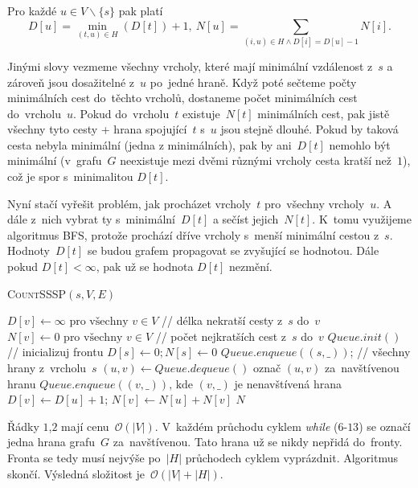 \documentclass[12pt]{article}
\newcommand{\la}{\leftarrow}
\renewcommand{\O}{\mathcal{O}}
\begin{document}

\noindent
Pro každé $u \in V \smallsetminus \{s\}$ pak platí
$$ D[u] = \min_{(t,u) \in H}(D[t])+1,~N[u] = \sum_{(i,u) \in H \wedge D[i] = D[u]-1} N[i].$$

\noindent
Jinými slovy vezmeme všechny vrcholy, které mají minimální vzdálenost z~$s$ a
zároveň jsou dosažitelné z~$u$ po~jedné hraně. Když poté sečteme počty
minimálních cest do~těchto vrcholů, dostaneme počet minimálních cest do~vrcholu~$u$. Pokud do~vrcholu~$t$ existuje~$N[t]$ minimálních cest, pak jistě všechny
tyto cesty + hrana spojující~$t$ s~$u$ jsou stejně dlouhé. Pokud by taková cesta
nebyla minimální (jedna z minimálních), pak by ani~$D[t]$ nemohlo být minimální
(v~grafu~$G$ neexistuje mezi dvěmi různými vrcholy cesta kratší než~$1$), což je
spor s~minimalitou $D[t]$.

\noindent
Nyní stačí vyřešit problém, jak procházet vrcholy~$t$ pro~všechny vrcholy~$u$. A dále z~nich vybrat ty s~minimální~$D[t]$ a sečíst jejich~$N[t]$. K~tomu
využijeme algoritmus \textsc{BFS}, protože prochází dříve vrcholy s~menší
minimální cestou z~$s$. Hodnoty~$D[t]$ se budou grafem propagovat se
zvyšující se hodnotou. Dále pokud $D[t] < \infty$, pak už se hodnota $D[t]$ nezmění.

\begin{algorithm}
\textsc{CountSSSP}$(s, V, E)$
\begin{algorithmic}[1]
\STATE $D[v] \la \infty \mbox{ pro všechny } v \in V$ // délka nekratší cesty z~$s$ do~$v$
\STATE $N[v] \la 0 \mbox{ pro všechny } v \in V$ // počet nejkratších cest z~$s$ do~$v$
\STATE $Queue.init()$ // inicializuj frontu
\STATE $D[s] \la 0; N[s] \la 0$
\STATE $Queue.enqueue((s,\_))$; // všechny hrany z~vrcholu~$s$
\STATE $(u,v) \la Queue.dequeue()$
\STATE označ $(u,v)$ za~navštívenou hranu
\STATE $Queue.enqueue((v,\_)) \mbox{, kde } (v,\_)$ je nenavštívená hrana
\STATE $D[v] \la D[u]+1$; $N[v] \la N[u] + N[v]$
\ENDIF
\ENDWHILE
\RETURN $N$
\end{algorithmic}
\end{algorithm}
Řádky $1$,$2$ mají cenu~$\O(|V|)$. V~každém průchodu cyklem
\textit{while} ($6$-$13$) se označí jedna hrana grafu~$G$ za~navštívenou. Tato
hrana už se nikdy nepřidá do~fronty. Fronta se tedy musí nejvýše po~$|H|$
průchodech cyklem vyprázdnit. Algoritmus skončí. Výsledná složitost je~$\O(|V|+|H|)$.
\end{document}
